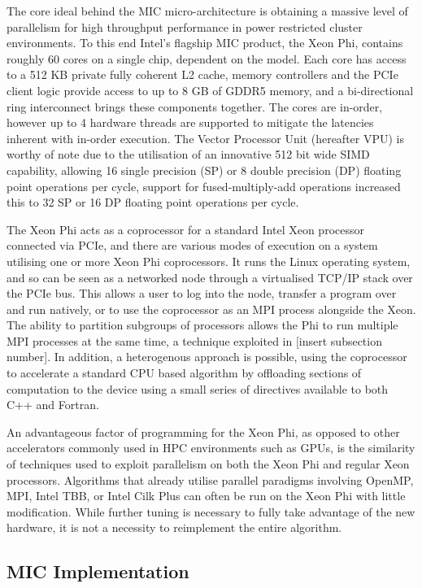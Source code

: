 \documentclass{easychair}
\begin{document}
The core ideal behind the MIC micro-architecture is obtaining a massive level of parallelism for high throughput 
performance in power restricted cluster environments. To this end Intel's flagship MIC product, the Xeon Phi, 
contains roughly 60 cores on a single chip, dependent on the model. Each core has access to a 512 KB private 
fully coherent L2 cache, memory controllers and the PCIe client logic provide access to up to 8 GB of GDDR5 
memory, and a bi-directional ring interconnect brings these components together. The cores are in-order, however 
up to 4 hardware threads are supported to mitigate the latencies inherent with in-order execution. The Vector 
Processor Unit (hereafter VPU) is worthy of note due to the utilisation of an innovative 512 bit wide SIMD 
capability, allowing 16 single precision (SP) or 8 double precision (DP) floating point operations per cycle, 
support for fused-multiply-add operations increased this to 32 SP or 16 DP floating point operations per cycle. 

The Xeon Phi acts as a coprocessor for a standard Intel Xeon processor connected via PCIe, and there are various 
modes of execution on a system utilising one or more Xeon Phi coprocessors. It runs the Linux operating system, 
and so can be seen as a networked node through a virtualised TCP/IP stack over the PCIe bus. This allows a user 
to log into the node, transfer a program over and run natively, or to use the coprocessor as an MPI process alongside 
the Xeon. The ability to partition subgroups of processors allows the Phi to run multiple MPI processes at the same 
time, a technique exploited in [insert subsection number]. In addition, a heterogenous approach is possible, using 
the coprocessor to accelerate a standard CPU based algorithm by offloading sections of computation to the device using 
a small series of directives available to both C++ and Fortran. 

An advantageous factor of programming for the Xeon Phi, as opposed to other accelerators commonly used in HPC 
environments such as GPUs, is the similarity of techniques used to exploit parallelism on both the Xeon Phi and 
regular Xeon processors. Algorithms that already utilise parallel paradigms involving OpenMP, MPI, Intel TBB, or 
Intel Cilk Plus can often be run on the Xeon Phi with little modification. While further tuning is necessary to 
fully take advantage of the new hardware, it is not a necessity to reimplement the entire algorithm.   


\subsection{MIC Implementation}
\label{sect:micimplementation}
\end{document}
